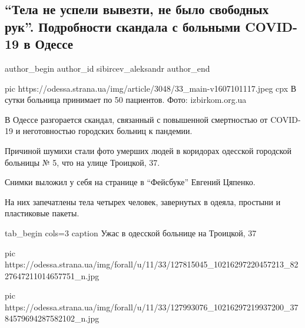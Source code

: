  
 
 
 
 
 
\subsection{\enquote{Тела не успели вывезти, не было свободных рук}. Подробности скандала с больными COVID-19 в Одессе}
\label{sec:04_12_2020.news.ua.strana.sibircev_aleksandr.1.covid_odessa}
\ifcmt
	author_begin
   author_id sibircev_aleksandr
	author_end
\fi

\ifcmt
pic https://odessa.strana.ua/img/article/3048/33_main-v1607101117.jpeg
cpx В сутки больница принимает по 50 пациентов. Фото: izbirkom.org.ua 
\fi


В Одессе разгорается скандал, связанный с повышенной смертностью от COVID-19 и
неготовностью городских больниц к пандемии.

Причиной шумихи стали фото умерших людей в коридорах одесской городской
больницы № 5, что на улице Троицкой, 37.

Снимки выложил у себя на странице в \enquote{Фейсбуке} Евгений Цяпенко.

На них запечатлены тела четырех человек, завернутых в одеяла, простыни и
пластиковые пакеты.

\ifcmt
tab_begin cols=3
	caption Ужас в одесской больнице на Троицкой, 37

pic https://odessa.strana.ua/img/forall/u/11/33/127815045_10216297220457213_8227647211014657751_n.jpg

pic https://odessa.strana.ua/img/forall/u/11/33/127993076_10216297219937200_3784579694287582102_n.jpg

